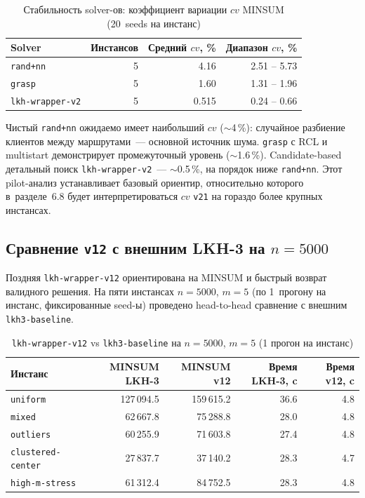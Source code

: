 \documentclass[14pt,a4paper]{extarticle}
\begin{document}
\begin{table}[H]
\centering
\caption{Стабильность solver-ов: коэффициент вариации $cv$ MINSUM (20~seeds на инстанс)}
\small
\begin{tabular}{lrrr}
\toprule
Solver & Инстансов & Средний $cv$, \% & Диапазон $cv$, \%\\
\midrule
\texttt{rand+nn}        & 5 & 4.16  & 2.51 -- 5.73\\
\texttt{grasp}          & 5 & 1.60  & 1.31 -- 1.96\\
\texttt{lkh-wrapper-v2} & 5 & 0.515 & 0.24 -- 0.66\\
\bottomrule
\end{tabular}
\normalsize
\end{table}

Чистый \texttt{rand+nn} ожидаемо имеет наибольший $cv$ ($\sim$4\,\%): случайное разбиение клиентов между маршрутами~--- основной источник шума. \texttt{grasp} с RCL и multistart демонстрирует промежуточный уровень ($\sim$1.6\,\%). Candidate-based детальный поиск \texttt{lkh-wrapper-v2}~--- $\sim$0.5\,\%, на порядок ниже \texttt{rand+nn}. Этот pilot-анализ устанавливает базовый ориентир, относительно которого в~разделе~6.8 будет интерпретироваться $cv$ \texttt{v21} на гораздо более крупных инстансах.

\subsection{Сравнение \texttt{v12} с внешним LKH-3 на $n=5000$}

Поздняя \texttt{lkh-wrapper-v12} ориентирована на MINSUM и быстрый возврат валидного решения. На пяти инстансах $n=5000$, $m=5$ (по 1~прогону на инстанс, фиксированные seed-ы) проведено head-to-head сравнение с внешним \texttt{lkh3-baseline}.

\begin{table}[H]
\centering
\caption{\texttt{lkh-wrapper-v12} vs \texttt{lkh3-baseline} на $n=5000$, $m=5$ (1 прогон на инстанс)}
\small
\begin{tabular}{lrrrr}
\toprule
Инстанс & MINSUM LKH-3 & MINSUM v12 & Время LKH-3, c & Время v12, c\\
\midrule
\texttt{uniform}          & 127\,094.5 & 159\,615.2 & 36.6 & 4.8\\
\texttt{mixed}            &  62\,667.8 &  75\,288.8 & 28.0 & 4.8\\
\texttt{outliers}         &  60\,255.9 &  71\,603.8 & 27.4 & 4.8\\
\texttt{clustered-center} &  27\,837.7 &  37\,140.2 & 28.3 & 4.7\\
\texttt{high-m-stress}    &  61\,312.4 &  84\,752.5 & 28.3 & 4.8\\
\bottomrule
\end{tabular}
\normalsize
\end{table}
\end{document}
